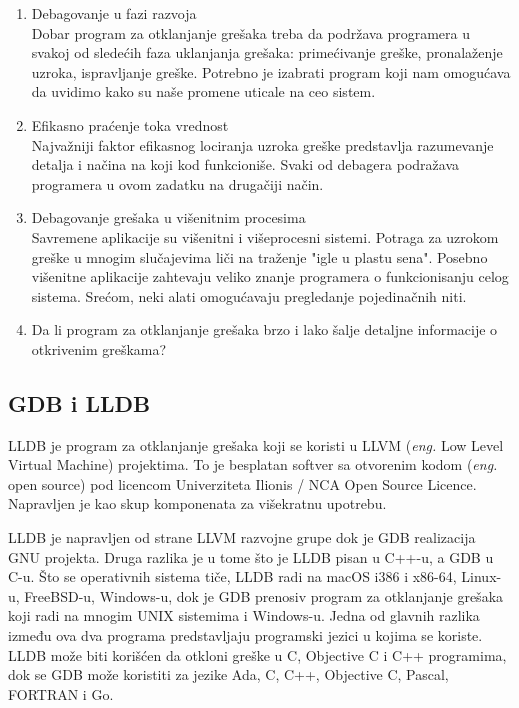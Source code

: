 \documentclass[a4paper]{article}
\begin{document}
\begin{enumerate}
\item Debagovanje u fazi razvoja \\
Dobar program za otklanjanje grešaka treba da podržava
programera u svakoj od sledećih faza uklanjanja grešaka:
primećivanje greške, pronalaženje uzroka, ispravljanje greške.
Potrebno je izabrati program koji nam omogućava da uvidimo kako
su naše promene uticale na ceo sistem.
\item Efikasno praćenje toka vrednost\\
Najvažniji faktor efikasnog lociranja uzroka greške predstavlja
razumevanje detalja i načina na koji kod funkcioniše. Svaki od
debagera podražava programera u ovom zadatku na drugačiji način.
\item Debagovanje grešaka u višenitnim procesima\\
Savremene aplikacije su višenitni i višeprocesni sistemi. 
Potraga za uzrokom greške u mnogim slučajevima liči na traženje "igle
u plastu sena". Posebno višenitne aplikacije zahtevaju veliko znanje
programera o funkcionisanju celog sistema.\cite{tools} 
Srećom, neki alati omogućavaju pregledanje pojedinačnih niti.
\item Da li program za otklanjanje grešaka brzo i lako šalje detaljne informacije o otkrivenim greškama?
\end{enumerate}

\subsection{GDB i LLDB}
\label{subsec:lldb}
LLDB je program za otklanjanje grešaka koji se koristi u LLVM 
(\textit{eng.} Low Level Virtual Machine) projektima. To je besplatan softver sa 
otvorenim kodom (\textit{eng.} open source) pod licencom 
Univerziteta Ilionis / NCA Open Source Licence. Napravljen je kao 
skup komponenata za višekratnu upotrebu\cite{lldb}. 

LLDB je napravljen od strane LLVM razvojne grupe dok je GDB 
realizacija GNU projekta. Druga razlika je u tome što je LLDB 
pisan u C++-u, a GDB u C-u. Što se operativnih sistema tiče, LLDB 
radi na macOS i386 i x86-64, Linux-u,  FreeBSD-u, Windows-u, 
dok je GDB prenosiv program za otklanjanje grešaka koji radi na 
mnogim UNIX sistemima i Windows-u. Jedna od glavnih razlika 
između ova dva programa predstavljaju programski jezici u kojima 
se koriste. LLDB može biti korišćen da otkloni greške u C, Objective 
C i C++ programima, dok se GDB može koristiti za jezike  Ada, C, 
C++, Objective C, Pascal, FORTRAN i Go.
\end{document}
